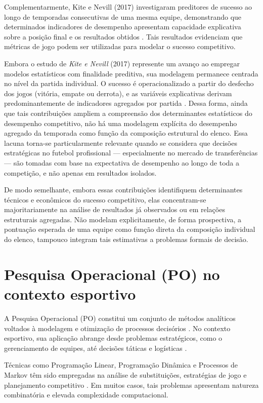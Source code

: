 Complementarmente, Kite e Nevill (2017) investigaram preditores de sucesso ao longo de temporadas consecutivas de uma mesma equipe, demonstrando que determinados 
indicadores de desempenho apresentam capacidade explicativa sobre a posição final e os resultados obtidos \cite{Kite2017}. Tais resultados evidenciam que métricas de jogo podem ser utilizadas 
para modelar o sucesso competitivo.

Embora o estudo de \textit{Kite e Nevill} (2017) represente um avanço ao empregar modelos estatísticos com finalidade preditiva, sua modelagem permanece 
centrada no nível da partida individual. O sucesso é operacionalizado a partir do desfecho dos jogos (vitória, empate ou derrota), e as variáveis explicativas derivam 
predominantemente de indicadores agregados por partida \cite{Kite2017}. Dessa forma, ainda que tais contribuições ampliem a compreensão dos determinantes estatísticos 
do desempenho competitivo, não há uma modelagem explícita do desempenho agregado da temporada como função da composição estrutural do elenco. Essa lacuna torna-se 
particularmente relevante quando se considera que decisões estratégicas no futebol profissional — especialmente no mercado de transferências — são tomadas com base 
na expectativa de desempenho ao longo de toda a competição, e não apenas em resultados isolados.

De modo semelhante, embora essas contribuições identifiquem determinantes técnicos e econômicos do sucesso competitivo, elas concentram-se majoritariamente na análise 
de resultados já observados ou em relações estruturais agregadas. Não modelam explicitamente, de forma prospectiva, a pontuação esperada de uma equipe como função direta 
da composição individual do elenco, tampouco integram tais estimativas a problemas formais de decisão.

\section{Pesquisa Operacional (PO) no contexto esportivo}

A Pesquisa Operacional (PO) constitui um conjunto de métodos analíticos voltados à modelagem e otimização de processos decisórios \cite{Medri2009,Wright2009}. 
No contexto esportivo, sua aplicação abrange desde problemas estratégicos, como o gerenciamento de equipes, até decisões táticas e logísticas \cite{Gerchak1994}.

Técnicas como Programação Linear, Programação Dinâmica e Processos de Markov têm sido empregadas na análise de substituições, estratégias de jogo e planejamento 
competitivo \cite{Clarke1998,Hirotsu2002}. Em muitos casos, tais problemas apresentam natureza combinatória e elevada complexidade computacional.

